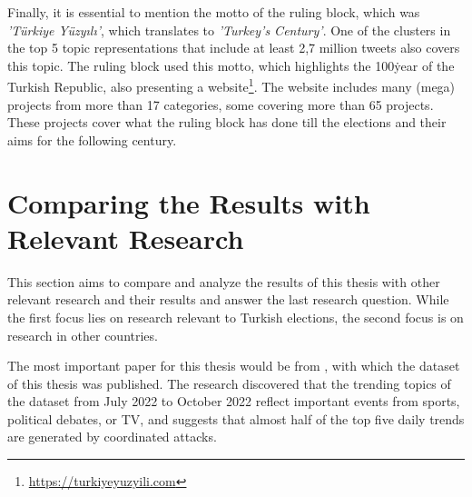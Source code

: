 Finally, it is essential to mention the motto of the ruling block, which was 
\textit{'Türkiye Yüzyılı'}, which translates to \textit{'Turkey's Century'}. One of the clusters 
in the top 5 topic representations that include at least 2,7 million tweets also covers this topic. 
The ruling block used this motto, which highlights the 100\. year of the Turkish Republic, also 
presenting a website\footnote{\url{https://turkiyeyuzyili.com}}. The website includes many 
(mega) projects from more than 17 categories, some covering more than 65 projects. 
These projects cover what the ruling block has done till the elections and their aims for the 
following century.



\section{Comparing the Results with Relevant Research}

This section aims to compare and analyze the results of this thesis with other relevant research and 
their results and answer the last research question. While the first focus lies on research relevant 
to Turkish elections, the second focus is on research in other countries.

The most important paper for this thesis would be from \textcite{secim2023}, with which the dataset 
of this thesis was published. The research discovered that the trending topics of the dataset from 
July 2022 to October 2022 reflect important events from sports, political debates, or TV, and 
suggests that almost half of the top five daily trends are generated by coordinated attacks. 

